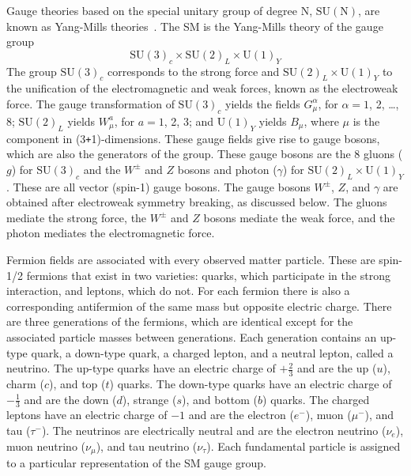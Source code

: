 Gauge theories based on the special unitary group of degree $\mathrm{N}$, $\mathrm{SU}(\mathrm{N})$, are known as Yang-Mills theories~\cite{Yang:1954ek}. The SM is the Yang-Mills theory of the gauge group %
\begin{equation*}
	\mathrm{SU}(3)_c \times \mathrm{SU}(2)_L \times \mathrm{U}(1)_Y
\end{equation*}
The group $\mathrm{SU}(3)_c$ corresponds to the strong force and $\mathrm{SU}(2)_L \times \mathrm{U}(1)_Y$ to the unification of the electromagnetic and weak forces, known as the electroweak force. The gauge transformation of $\mathrm{SU}(3)_c$ yields the fields $G_{\mu}^{\alpha}$, for $\alpha = 1$, 2, \dots, 8; $\mathrm{SU}(2)_L$ yields $W_{\mu}^a$, for $a = 1$, 2, 3; and $\mathrm{U}(1)_Y$ yields $B_{\mu}$, where $\mu$ is the component in (3\texttt{+}1)-dimensions. These gauge fields give rise to gauge bosons, which are also the generators of the group. These gauge bosons are the 8 gluons ($g$) for $\mathrm{SU}(3)_c$ and the $W^{\pm}$ and $Z$ bosons and photon ($\gamma$) for $\mathrm{SU}(2)_L \times \mathrm{U}(1)_Y$. These are all vector (spin-1) gauge bosons. The gauge bosons $W^{\pm}$, $Z$, and $\gamma$ are obtained after electroweak symmetry breaking, as discussed below. The gluons mediate the strong force, the $W^{\pm}$ and $Z$ bosons mediate the weak force, and the photon mediates the electromagnetic force.

Fermion fields are associated with every observed matter particle. These are spin-1/2 fermions that exist in two varieties: quarks, which participate in the strong interaction, and leptons, which do not. For each  fermion there is also a corresponding antifermion of the same mass but opposite electric charge. There are three generations of the fermions, which are identical except for the associated particle masses between generations. Each generation contains an up-type quark, a down-type quark, a charged lepton, and a neutral lepton, called a neutrino. The up-type quarks have an electric charge of $+\frac{2}{3}$ and are the up ($u$), charm ($c$), and top ($t$) quarks. The down-type quarks have an electric charge of $-\frac{1}{3}$ and are the down ($d$), strange ($s$), and bottom ($b$) quarks. The charged leptons have an electric charge of $-1$ and are the electron ($e^-$), muon ($\mu^-$), and tau ($\tau^-$). The neutrinos are electrically neutral and are the electron neutrino ($\nu_e$), muon neutrino ($\nu_{\mu}$), and tau neutrino ($\nu_{\tau}$). Each fundamental particle is assigned to a particular representation of the SM gauge group.


